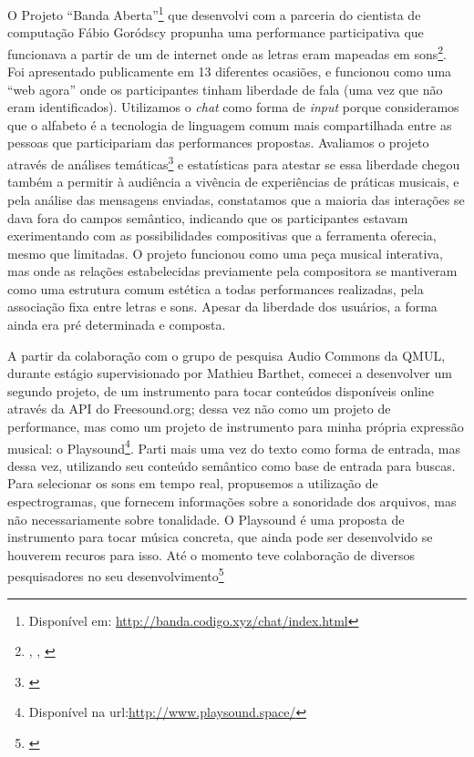O Projeto ``Banda Aberta''\footnote{Disponível em: \url{http://banda.codigo.xyz/chat/index.html}} que desenvolvi com a parceria do cientista de computação Fábio Goródscy propunha uma performance participativa que funcionava a partir de um  de internet onde as letras eram mapeadas em sons\footnote{\cite{Stolfi2017}, \cite{Stolfi2017w}, \cite{Stolfi2018}}. Foi apresentado publicamente em 13 diferentes ocasiões, e funcionou como uma ``web agora'' onde os participantes tinham liberdade de fala (uma vez que não eram identificados). Utilizamos o \emph{chat} como forma de \emph{input} porque consideramos que o alfabeto é a tecnologia de linguagem comum mais compartilhada entre as pessoas que participariam das performances propostas. Avaliamos o projeto através de análises temáticas\footnote{\cite{Braun2006}} e estatísticas para atestar se essa liberdade chegou também a permitir à audiência a vivência de experiências de práticas musicais, e pela análise das mensagens enviadas, constatamos que a maioria das interações se dava fora do campos semântico, indicando que os participantes estavam exerimentando com as possibilidades compositivas que a ferramenta oferecia, mesmo que limitadas. O projeto funcionou como uma peça musical interativa, mas onde as relações estabelecidas previamente pela compositora se mantiveram como uma estrutura comum estética a todas performances realizadas, pela associação fixa entre letras e sons. Apesar da liberdade dos usuários, a forma ainda era pré determinada e composta. 

A partir da colaboração com o grupo de pesquisa Audio Commons da QMUL, durante estágio supervisionado por Mathieu Barthet, comecei a desenvolver um segundo projeto, de um instrumento para tocar conteúdos disponíveis online através da API do Freesound.org; dessa vez não como um projeto de performance, mas como um projeto de instrumento para minha própria expressão musical: o Playsound\footnote{Disponível na url:\url{http://www.playsound.space/}}. Parti mais uma vez do texto como forma de entrada, mas dessa vez, utilizando seu conteúdo semântico como base de entrada para buscas. Para selecionar os sons em tempo real, propusemos a utilização de espectrogramas, que fornecem informações sobre a sonoridade dos arquivos, mas não necessariamente sobre tonalidade. O Playsound é uma proposta de instrumento para tocar música concreta, que ainda pode ser desenvolvido se houverem recuros para isso. Até o momento teve colaboração de diversos pesquisadores no seu desenvolvimento\footnote{\cite{}} 


